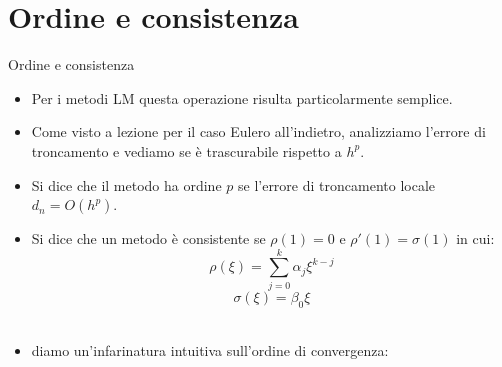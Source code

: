 \documentclass[aspectratio=169, 10pt, handout,usenames,dvipsnames]{beamer}
\begin{document}
\section{Ordine e consistenza}\label{sec:sec8}
    \begin{frame}{Ordine e consistenza }
        \begin{itemize}
            \item Per i metodi LM questa operazione risulta particolarmente semplice.
        \end{itemize}
        \begin{itemize}
            \item Come visto a lezione per il caso Eulero all'indietro, analizziamo l'errore di troncamento e vediamo se è trascurabile rispetto a $h^p$.
            \item Si dice che il metodo ha ordine $p$ se l'errore di troncamento locale $d_n = O(h^p)$.
            \item Si dice che un metodo è consistente se $\rho(1) = 0$ \space e \space $\rho'(1) = \sigma(1)$ in cui:\\
            \[\rho(\xi) = \displaystyle\sum_{j=0}^k \alpha_j\xi^{k-j}\]  \space\space\space \[\sigma(\xi) = \beta_0\xi \] \\
            
            \item diamo un'infarinatura intuitiva sull'ordine di convergenza:
        \end{itemize}
        
    \end{frame}
    
\end{document}
